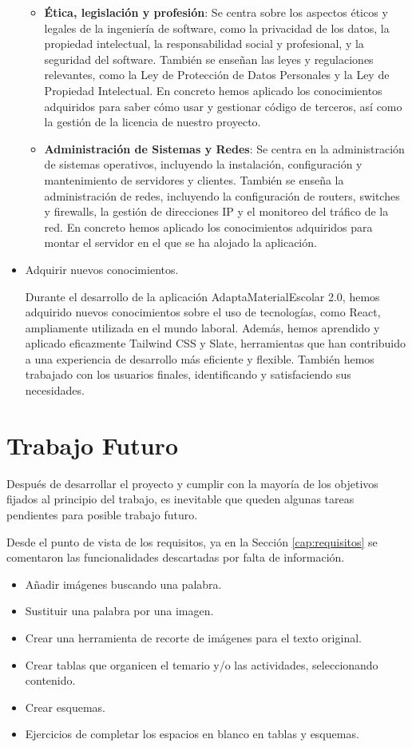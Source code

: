 \begin{itemize}
\begin{itemize}
        \item \textbf{Ética, legislación y profesión}: Se centra sobre los aspectos éticos y legales de la ingeniería de software, como la privacidad de los datos, la propiedad intelectual, la responsabilidad social y profesional, y la seguridad del software. También se enseñan las leyes y regulaciones relevantes, como la Ley de Protección de Datos Personales y la Ley de Propiedad Intelectual. En concreto hemos aplicado los conocimientos adquiridos para saber cómo usar y gestionar código de terceros, así como la gestión de la licencia de nuestro proyecto.
        \item \textbf{Administración de Sistemas y Redes}: Se centra en la administración de sistemas operativos, incluyendo la instalación, configuración y mantenimiento de servidores y clientes. También se enseña la administración de redes, incluyendo la configuración de routers, switches y firewalls, la gestión de direcciones IP y el monitoreo del tráfico de la red. En concreto hemos aplicado los conocimientos adquiridos para montar el servidor en el que se ha alojado la aplicación.
    \end{itemize}
    \item Adquirir nuevos conocimientos.
    
    Durante el desarrollo de la aplicación AdaptaMaterialEscolar 2.0, hemos adquirido nuevos conocimientos sobre el uso de tecnologías, como React, ampliamente utilizada en el mundo laboral. Además, hemos aprendido y aplicado eficazmente Tailwind CSS y Slate, herramientas que han contribuido a una experiencia de desarrollo más eficiente y flexible. También hemos trabajado con los usuarios finales, identificando y satisfaciendo sus necesidades.
 \end{itemize}




\section{Trabajo Futuro}
\label{sec:TrabajoFuturo}
Después de desarrollar el proyecto y cumplir con la mayoría de los objetivos fijados al principio del trabajo, es inevitable que queden algunas tareas pendientes para posible trabajo futuro.

Desde el punto de vista de los requisitos, ya en la Sección \ref{cap:requisitos} se comentaron las funcionalidades descartadas por falta de información.

\begin{itemize}
    \item Añadir imágenes buscando una palabra.
    \item Sustituir una palabra por una imagen.
    \item Crear una herramienta de recorte de imágenes para el texto original.
    \item Crear tablas que organicen el temario y/o las actividades, seleccionando contenido.
    \item Crear esquemas.
    \item Ejercicios de completar los espacios en blanco en tablas y esquemas.
\end{itemize}

